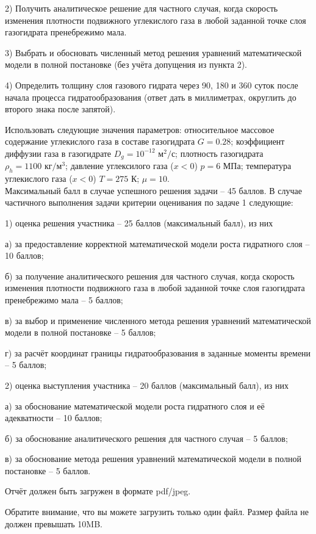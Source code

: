\documentclass[a4paper, 12pt]{article}
\begin{document}
2) Получить аналитическое решение для частного случая, когда скорость изменения плотности подвижного углекислого газа в любой заданной точке слоя газогидрата пренебрежимо мала.

3) Выбрать и обосновать численный метод решения уравнений математической модели в полной постановке (без учёта допущения из пункта 2).

4) Определить толщину слоя газового гидрата через 90, 180 и 360 суток после начала процесса гидратообразования (ответ дать в миллиметрах, округлить до второго знака после запятой).

Использовать следующие значения параметров: относительное массовое содержание углекислого газа в составе газогидрата $G=0.28$; коэффициент диффузии газа в газогидрате $D_g=10^{-12}\text{ м}^2/\text{с}$; плотность газогидрата $\rho_h=1100\text{ кг}/\text{м}^3$; давление углексилого газа ($x<0$) $p=6\text{ МПа}$; температура углекислого газа ($x<0$) $T=275\text{ К}$; $\mu=10$.\\

Максимальный балл в случае успешного решения задачи -- 45 баллов.
В случае частичного выполнения задачи критерии оценивания по задаче 1 следующие:

1) оценка решения участника -- 25 баллов (максимальный балл), из них

\hspace{7pt} а) за предоставление корректной математической модели роста гидратного слоя -- 10 баллов;

\hspace{10pt} б) за получение аналитического решения для частного случая, когда скорость изменения плотности подвижного газа в любой заданной точке слоя газогидрата пренебрежимо мала -- 5 баллов;

\hspace{10pt} в) за выбор и применение численного метода решения уравнений математической модели в полной постановке -- 5 баллов;

\hspace{10pt} г) за расчёт координат границы гидратообразования в заданные моменты времени -- 5 баллов;

2) оценка выступления участника -- 20 баллов (максимальный балл), из них

\hspace{10pt} а) за обоснование математической модели роста гидратного слоя и её адекватности -- 10 баллов;

\hspace{10pt} б) за обоснование аналитического решения для частного случая -- 5 баллов;

\hspace{10pt} в) за обоснование метода решения уравнений математической модели в полной постановке -- 5 баллов.

Отчёт должен быть загружен в формате pdf/jpeg.

Обратите внимание, что вы можете загрузить только один файл.
Размер файла не должен превышать 10MB.
\end{document}
